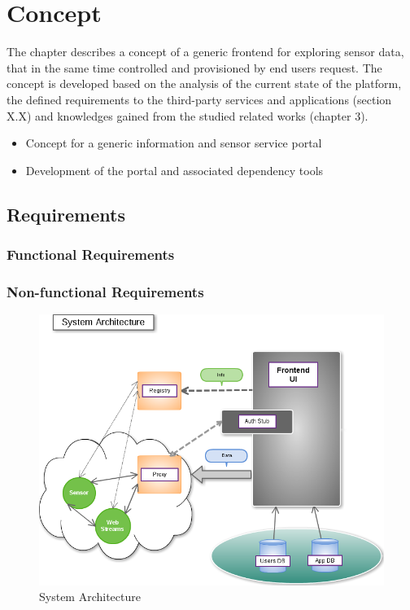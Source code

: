\chapter{Concept}
     The chapter describes a concept of a generic frontend for exploring sensor data, 
     that in the same time controlled and provisioned by end users request. 
     The concept is developed based on the analysis of the current
     state of the platform, the defined requirements to the third-party services and applications
     (section X.X) and knowledges gained from the studied related works (chapter 3).

\begin{itemize}
     \item  Concept for a generic information and sensor service portal
     \item Development of the portal and associated dependency tools
\end{itemize}

\section{Requirements}

\subsection{Functional Requirements}

\subsection{Non-functional Requirements}

\begin{figure}[!ht]
\centering
\includegraphics[scale=0.5]{images/Structure.png}   
\caption[System Architecture]{System Architecture}
\label{img:structure}                           
\end{figure}

